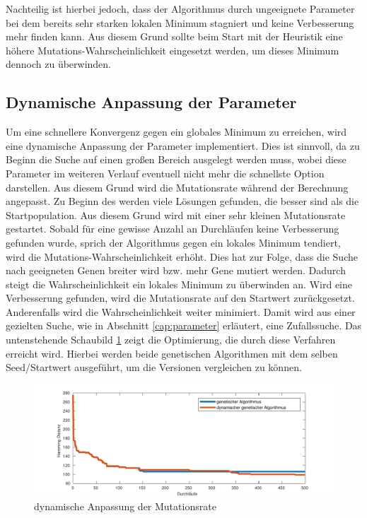 Nachteilig ist hierbei jedoch, dass der Algorithmus durch ungeeignete Parameter bei dem bereits sehr starken lokalen Minimum stagniert und keine Verbesserung mehr finden kann. Aus diesem Grund sollte beim Start mit der Heuristik eine höhere Mutations-Wahrscheinlichkeit eingesetzt werden, um dieses Minimum dennoch zu überwinden.

\subsection{Dynamische Anpassung der Parameter}
Um eine schnellere Konvergenz gegen ein globales Minimum zu erreichen, wird eine dynamische Anpassung der Parameter implementiert. Dies ist sinnvoll, da zu Beginn die Suche auf einen großen Bereich ausgelegt werden muss, wobei diese Parameter im weiteren Verlauf eventuell nicht mehr die schnellste Option darstellen. Aus diesem Grund wird die Mutationsrate während der Berechnung angepasst. Zu Beginn des werden viele Lösungen gefunden, die besser sind als die Startpopulation. Aus diesem Grund wird mit einer sehr kleinen Mutationsrate gestartet. Sobald für eine gewisse Anzahl an Durchläufen keine Verbesserung gefunden wurde, sprich der Algorithmus gegen ein lokales Minimum tendiert, wird die Mutations-Wahrscheinlichkeit erhöht. Dies hat zur Folge, dass die Suche nach geeigneten Genen breiter wird bzw. mehr Gene mutiert werden. Dadurch steigt die Wahrscheinlichkeit ein lokales Minimum zu überwinden an. Wird eine Verbesserung gefunden, wird die Mutationsrate auf den Startwert zurückgesetzt. Anderenfalls wird die Wahrscheinlichkeit weiter minimiert. Damit wird aus einer gezielten Suche, wie in Abschnitt \ref{cap:parameter} erläutert, eine Zufallssuche.
Das untenstehende Schaubild \ref{fig:dyn_genetic} zeigt die Optimierung, die durch diese Verfahren erreicht wird. Hierbei werden beide genetischen Algorithmen mit dem selben Seed/Startwert ausgeführt, um die Versionen vergleichen zu können.

\begin{figure}[H]
	\centering
	\includegraphics[width=\textwidth]{fig/dyn_genetic.pdf}
	\caption{dynamische Anpassung der Mutationsrate}
	\label{fig:dyn_genetic}
\end{figure}
 
